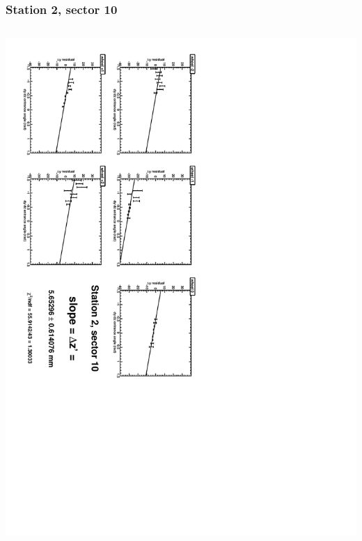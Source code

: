 \documentclass[compress]{beamer}
\begin{document}
\begin{frame}
\frametitle{Station 2, sector 10}
\begin{columns}
\includegraphics[height=\linewidth, angle=90]{zfits/zfit_2_10.pdf}


\end{columns}
\end{frame}
\end{document}

